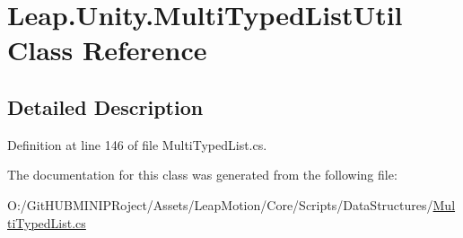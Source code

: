 \hypertarget{class_leap_1_1_unity_1_1_multi_typed_list_util}{}\section{Leap.\+Unity.\+Multi\+Typed\+List\+Util Class Reference}
\label{class_leap_1_1_unity_1_1_multi_typed_list_util}


\subsection{Detailed Description}


Definition at line 146 of file Multi\+Typed\+List.\+cs.



The documentation for this class was generated from the following file\+:\begin{DoxyCompactItemize}
\item 
O\+:/\+Git\+H\+U\+B\+M\+I\+N\+I\+P\+Roject/\+Assets/\+Leap\+Motion/\+Core/\+Scripts/\+Data\+Structures/\mbox{\hyperlink{_multi_typed_list_8cs}{Multi\+Typed\+List.\+cs}}\end{DoxyCompactItemize}
